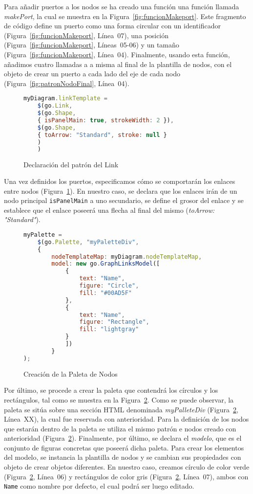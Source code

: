 Para añadir puertos a los nodos se ha creado una función una función llamada \emph{makePort}, la cual se muestra en la Figura~\ref{fig:funcionMakeport}. Este fragmento de código define un puerto como una forma circular con un identificador (Figura~\ref{fig:funcionMakeport}, Línea~07), una posición (Figura~\ref{fig:funcionMakeport}, Líneas~05-06) y un tamaño (Figura~\ref{fig:funcionMakeport}, Línea~04). Finalmente, usando esta función, añadimos cuatro llamadas a a misma al final de la plantilla de nodos, con el objeto de crear un puerto a cada lado del eje de cada nodo (Figura~\ref{fig:patronNodoFinal}, Línea~04).

\begin{figure}[H]
	\centering
	\begin{lstlisting}[language=JavaScript]
	myDiagram.linkTemplate =
	$(go.Link,
	$(go.Shape,
	{ isPanelMain: true, strokeWidth: 2 }),
	$(go.Shape,
	{ toArrow: "Standard", stroke: null }
	)
	)\end{lstlisting}
	\caption{Declaración del patrón del Link}
	\label{fig:patronlink}
\end{figure}

Una vez definidos los puertos, especificamos cómo se comportarán los enlaces entre nodos (Figura~\ref{fig:patronlink}). En nuestro caso, se declara que los enlaces irán de un nodo principal \texttt{isPanelMain} a uno secundario,  se define el grosor del enlace y se establece que el enlace poseerá una flecha al final del mismo (\emph{toArrow: "Standard"}).




\begin{figure}[H]
	\centering
\begin{lstlisting}[language=JavaScript]
myPalette =
	$(go.Palette, "myPaletteDiv",
	{
		nodeTemplateMap: myDiagram.nodeTemplateMap,
		model: new go.GraphLinksModel([
			{ 
				text: "Name", 
				figure: "Circle", 
				fill: "#00AD5F" 
			},
			{ 
				text: "Name", 
				figure: "Rectangle", 
				fill: "lightgray" 
			}
			])
		}
);\end{lstlisting}
\caption{Creación de la Paleta de Nodos}
\label{fig:paletaNodos}
\end{figure}

Por último, se procede a crear la paleta que contendrá los círculos y los rectángulos, tal como se muestra en la Figura~\ref{fig:paletaNodos}. Como se puede observar, la paleta se sitúa sobre una sección HTML denominada \emph{myPalleteDiv} (Figura~\ref{fig:paletaNodos}, Línea~XX), la cual fue reservada con anterioridad. Para la definición de los nodos que estarán dentro de la paleta se utiliza el mismo patrón e nodos creado con anterioridad (Figura~\ref{fig:paletaNodos}). Finalmente, por último, se declara el \emph{modelo}, que es el conjunto de figuras concretas que poseerá dicha paleta. Para crear los elementos del modelo, se instancia la plantilla de nodos y se cambian sus propiedades con objeto de crear objetos diferentes. En nuestro caso, creamos círculo de color verde (Figura~\ref{fig:paletaNodos}, Línea~06) y rectángulos de color gris (Figura~\ref{fig:paletaNodos}, Línea~07), ambos con \texttt{Name} como nombre por defecto, el cual podrá ser luego editado.

